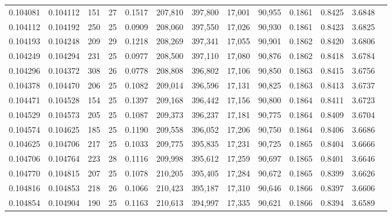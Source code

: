 \begin{tabular}{rrrrrrrrrrrrr}
0.104081 & 0.104112 & 151 &  27 &                                     0.1517 & 207,810 & 397,800 &  17,001 &  90,955 & 0.1861 & 0.8425 & 3.6848 \\
0.104112 & 0.104192 & 250 &  25 &                                     0.0909 & 208,060 & 397,550 &  17,026 &  90,930 & 0.1861 & 0.8423 & 3.6825 \\
0.104193 & 0.104248 & 209 &  29 &                                     0.1218 & 208,269 & 397,341 &  17,055 &  90,901 & 0.1862 & 0.8420 & 3.6806 \\
0.104249 & 0.104294 & 231 &  25 &                                     0.0977 & 208,500 & 397,110 &  17,080 &  90,876 & 0.1862 & 0.8418 & 3.6784 \\
0.104296 & 0.104372 & 308 &  26 &                                     0.0778 & 208,808 & 396,802 &  17,106 &  90,850 & 0.1863 & 0.8415 & 3.6756 \\
0.104378 & 0.104470 & 206 &  25 &                                     0.1082 & 209,014 & 396,596 &  17,131 &  90,825 & 0.1863 & 0.8413 & 3.6737 \\
0.104471 & 0.104528 & 154 &  25 &                                     0.1397 & 209,168 & 396,442 &  17,156 &  90,800 & 0.1864 & 0.8411 & 3.6723 \\
0.104529 & 0.104573 & 205 &  25 &                                     0.1087 & 209,373 & 396,237 &  17,181 &  90,775 & 0.1864 & 0.8409 & 3.6704 \\
0.104574 & 0.104625 & 185 &  25 &                                     0.1190 & 209,558 & 396,052 &  17,206 &  90,750 & 0.1864 & 0.8406 & 3.6686 \\
0.104625 & 0.104706 & 217 &  25 &                                     0.1033 & 209,775 & 395,835 &  17,231 &  90,725 & 0.1865 & 0.8404 & 3.6666 \\
0.104706 & 0.104764 & 223 &  28 &                                     0.1116 & 209,998 & 395,612 &  17,259 &  90,697 & 0.1865 & 0.8401 & 3.6646 \\
0.104770 & 0.104815 & 207 &  25 &                                     0.1078 & 210,205 & 395,405 &  17,284 &  90,672 & 0.1865 & 0.8399 & 3.6626 \\
0.104816 & 0.104853 & 218 &  26 &                                     0.1066 & 210,423 & 395,187 &  17,310 &  90,646 & 0.1866 & 0.8397 & 3.6606 \\
0.104854 & 0.104904 & 190 &  25 &                                     0.1163 & 210,613 & 394,997 &  17,335 &  90,621 & 0.1866 & 0.8394 & 3.6589 \\

\end{tabular}
